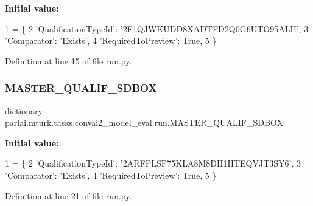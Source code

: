 {\bfseries Initial value\+:}
\begin{DoxyCode}
1 =  \{
2     \textcolor{stringliteral}{'QualificationTypeId'}: \textcolor{stringliteral}{'2F1QJWKUDD8XADTFD2Q0G6UTO95ALH'},
3     \textcolor{stringliteral}{'Comparator'}: \textcolor{stringliteral}{'Exists'},
4     \textcolor{stringliteral}{'RequiredToPreview'}: \textcolor{keyword}{True},
5 \}
\end{DoxyCode}


Definition at line 15 of file run.\+py.

\mbox{\label{namespaceparlai_1_1mturk_1_1tasks_1_1convai2__model__eval_1_1run_ae483985edefe82c63e9b78a5a7bccfb3}} 
\subsubsection{\texorpdfstring{M\+A\+S\+T\+E\+R\+\_\+\+Q\+U\+A\+L\+I\+F\+\_\+\+S\+D\+B\+OX}{MASTER\_QUALIF\_SDBOX}}
{\footnotesize\ttfamily dictionary parlai.\+mturk.\+tasks.\+convai2\+\_\+model\+\_\+eval.\+run.\+M\+A\+S\+T\+E\+R\+\_\+\+Q\+U\+A\+L\+I\+F\+\_\+\+S\+D\+B\+OX}

{\bfseries Initial value\+:}
\begin{DoxyCode}
1 =  \{
2     \textcolor{stringliteral}{'QualificationTypeId'}: \textcolor{stringliteral}{'2ARFPLSP75KLA8M8DH1HTEQVJT3SY6'},
3     \textcolor{stringliteral}{'Comparator'}: \textcolor{stringliteral}{'Exists'},
4     \textcolor{stringliteral}{'RequiredToPreview'}: \textcolor{keyword}{True},
5 \}
\end{DoxyCode}


Definition at line 21 of file run.\+py.


